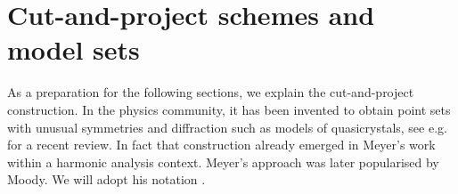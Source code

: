 \documentclass[11pt, a4wide]{amsart}
\numberwithin{lemma}{section}
\begin{document}
\section{Cut-and-project schemes and model sets}\label{cpmodel}

As a preparation for the following sections, we explain the cut-and-project construction. In the physics community, it has been invented to obtain point sets with unusual symmetries \cite{KN} and diffraction  \cite{DK} such as models of quasicrystals, see e.g.~\cite{RS17b} for a recent review.  In fact that construction already emerged in Meyer's work \cite{Meyer} within a harmonic analysis context. Meyer's approach was later popularised by Moody. We will adopt his notation  \cite{Moody-old,Moody-model sets}.

\smallskip
\end{document}
